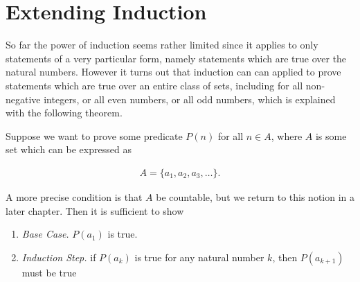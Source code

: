 \documentclass[twoside]{report}
\begin{document}
\section{Extending Induction}

So far the power of induction seems rather limited since it applies to only statements of a very particular form, namely statements which are true over the natural numbers. However it turns out that induction can can applied to prove statements which are true over an entire class of sets, including for all non-negative integers, or all even numbers, or all odd numbers, which is explained with the following theorem.

\vspace{\baselineskip}
\begin{theorem}
	Suppose we want to prove some predicate $P(n)$ for all $n \in A$, where $A$ is some set which can be expressed as
	
	\begin{align*}
		A = \{ a_1, a_2, a_3, \dots \}.
	\end{align*}
	
	A more precise condition is that $A$ be countable, but we return to this notion in a later chapter. Then it is sufficient to show
	\vspace{\baselineskip}
	\begin{enumerate}
		\item \emph{Base Case.} $P(a_1)$ is true.
		\item \emph{Induction Step.} if $P(a_k)$ is true for any natural number $k$, then $P(a_{k + 1})$ must be true
	\end{enumerate}
\end{theorem}
\end{document}

